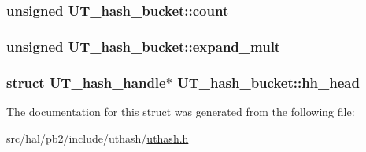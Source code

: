 \subsubsection[{\texorpdfstring{count}{count}}]{\setlength{\rightskip}{0pt plus 5cm}unsigned U\+T\+\_\+hash\+\_\+bucket\+::count}\hypertarget{struct_u_t__hash__bucket_a5d20cc12bdcbde360398910eefb45634}{}\label{struct_u_t__hash__bucket_a5d20cc12bdcbde360398910eefb45634}
\subsubsection[{\texorpdfstring{expand\+\_\+mult}{expand_mult}}]{\setlength{\rightskip}{0pt plus 5cm}unsigned U\+T\+\_\+hash\+\_\+bucket\+::expand\+\_\+mult}\hypertarget{struct_u_t__hash__bucket_a9b739c1b69c141e8198c0c64af643b2b}{}\label{struct_u_t__hash__bucket_a9b739c1b69c141e8198c0c64af643b2b}
\subsubsection[{\texorpdfstring{hh\+\_\+head}{hh_head}}]{\setlength{\rightskip}{0pt plus 5cm}struct {\bf U\+T\+\_\+hash\+\_\+handle}$\ast$ U\+T\+\_\+hash\+\_\+bucket\+::hh\+\_\+head}\hypertarget{struct_u_t__hash__bucket_a785a785132212378bb28fb4341cfecaf}{}\label{struct_u_t__hash__bucket_a785a785132212378bb28fb4341cfecaf}


The documentation for this struct was generated from the following file\+:\begin{DoxyCompactItemize}
\item 
src/hal/pb2/include/uthash/\hyperlink{uthash_8h}{uthash.\+h}\end{DoxyCompactItemize}
